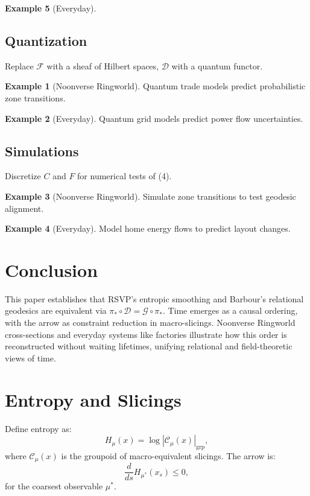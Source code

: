 \documentclass[11pt]{article}
\theoremstyle{plain}
\theoremstyle{definition}
\newtheorem{example}{Example}[section]
\begin{document}
\begin{example}[Everyday]
\subsection{Quantization}
Replace $\mathscr{F}$ with a sheaf of Hilbert spaces, $\mathcal{D}$ with a quantum functor.

\begin{example}[Noonverse Ringworld]
Quantum trade models predict probabilistic zone transitions.
\end{example}

\begin{example}[Everyday]
Quantum grid models predict power flow uncertainties.
\end{example}

\subsection{Simulations}
Discretize $C$ and $F$ for numerical tests of (4).

\begin{example}[Noonverse Ringworld]
Simulate zone transitions to test geodesic alignment.
\end{example}

\begin{example}[Everyday]
Model home energy flows to predict layout changes.
\end{example}

\section{Conclusion}
This paper establishes that RSVP’s entropic smoothing and Barbour’s relational geodesics are equivalent via $\pi_* \circ \mathcal{D} = \mathcal{G} \circ \pi_*$. Time emerges as a causal ordering, with the arrow as constraint reduction in macro-slicings. Noonverse Ringworld cross-sections and everyday systems like factories illustrate how this order is reconstructed without waiting lifetimes, unifying relational and field-theoretic views of time.

\appendix

\section{Entropy and Slicings}
Define entropy as:
\begin{equation}
H_\mu(x) = \log | \mathcal{C}_\mu(x) |_{\text{grp}},
\end{equation}
where $\mathcal{C}_\mu(x)$ is the groupoid of macro-equivalent slicings. The arrow is:
\begin{equation}
\frac{d}{ds} H_{\mu^*}(x_s) \leq 0,
\end{equation}
for the coarsest observable $\mu^*$.


\end{example}
\end{document}

